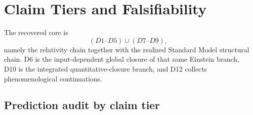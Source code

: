 \documentclass[11pt]{article}
\begin{document}
\section{Claim Tiers and Falsifiability}\label{sec:claim-tiers}

The recovered core is
\[
(D1\text{--}D5)\cup(D7\text{--}D9),
\]
namely the relativity chain together with the realized Standard Model structural chain. D6 is the input-dependent global closure of that same Einstein branch, D10 is the integrated quantitative-closure branch, and D12 collects phenomenological continuations.

\subsection{Prediction audit by claim tier}
\end{document}
